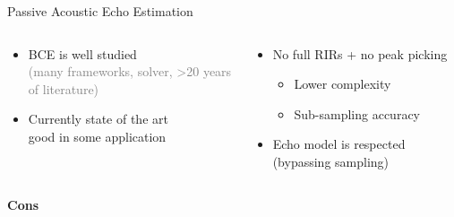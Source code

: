 \begin{frame}[t]{Passive Acoustic Echo Estimation \hfill\faPalette}
\begin{columns}[onlytextwidth]
            \begin{column}{.48\textwidth}
                \begin{itemize}
                    \item BCE is well studied
                    \\\textcolor{gray}{\small (many frameworks, solver, >20 years of literature)}
                    \item Currently state of the art
                    \\good in some application %
                \end{itemize}
            \end{column}
            \begin{column}{.48\textwidth}
                \begin{itemize}
                    \item No full RIRs + no peak picking
                    \begin{itemize}
                        \item Lower complexity
                        \item Sub-sampling accuracy
                    \end{itemize}
                    \item Echo model is respected (bypassing sampling)
                    \\
                    \end{itemize}
            \end{column}%
        \end{columns}

        \vspace{1em}
        \begin{columns}[onlytextwidth] %
            \begin{column}{.02\textwidth}
                \textcolor{myred}{\textbf{Cons}}
            \end{column}


\end{columns}
\end{frame}
